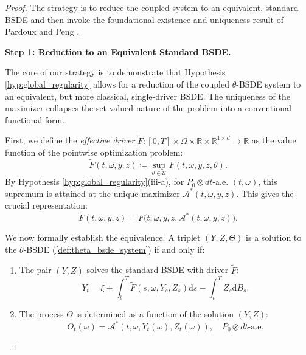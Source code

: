 \documentclass[12pt, letterpaper]{amsart}
\newcommand{\Thetacal}{\mathcal{A}}
\newcommand{\Ucal}{\mathcal{U}}
\newcommand{\R}{\mathbb{R}}
\newcommand{\dd}{\mathrm{d}}
\theoremstyle{plain}
\theoremstyle{definition}
\theoremstyle{remark}
\numberwithin{equation}{section} %
\begin{document}
\begin{proof}
The strategy is to reduce the coupled system to an equivalent, standard BSDE and then invoke the foundational existence and uniqueness result of Pardoux and Peng \cite{PardouxPeng1990}.

\vspace{1ex}
\noindent\textbf{Step 1: Reduction to an Equivalent Standard BSDE.}

The core of our strategy is to demonstrate that Hypothesis \ref{hyp:global_regularity} allows for a reduction of the coupled $\theta$-BSDE system to an equivalent, but more classical, single-driver BSDE. The uniqueness of the maximizer collapses the set-valued nature of the problem into a conventional functional form.

First, we define the \emph{effective driver} $\tilde{F}: [0,T]\times\Omega\times\R\times\R^{1\times d} \to \R$ as the value function of the pointwise optimization problem:
\begin{equation}
    \tilde{F}(t,\omega,y,z) \coloneqq \sup_{\theta \in \Ucal} F(t,\omega,y,z,\theta).
\end{equation}
By Hypothesis \ref{hyp:global_regularity}(iii-a), for $P_0\otimes dt$-a.e. $(t,\omega)$, this supremum is attained at the unique maximizer $\Thetacal^*(t,\omega,y,z)$. This gives the crucial representation:
\begin{equation}
    \tilde{F}(t,\omega,y,z) = F\big(t, \omega, y, z, \Thetacal^*(t,\omega,y,z)\big).
\end{equation}

We now formally establish the equivalence. A triplet $(Y,Z,\Theta)$ is a solution to the $\theta$-BSDE (\cref{def:theta_bsde_system}) if and only if:
\begin{enumerate}[label=(\alph*)]
    \item The pair $(Y,Z)$ solves the standard BSDE with driver $\tilde{F}$:
    \begin{equation} \label{eq:proof_effective_bsde_step1}
        Y_t = \xi + \int_t^T \tilde{F}(s, \omega, Y_s, Z_s) \dd s - \int_t^T Z_s \dd B_s.
    \end{equation}
    \item The process $\Theta$ is determined as a function of the solution $(Y,Z)$:
    \begin{equation} \label{eq:theta_as_function}
         \Theta_t(\omega) = \Thetacal^*(t, \omega, Y_t(\omega), Z_t(\omega)), \quad P_0 \otimes dt\text{-a.e.}
    \end{equation}
\end{enumerate}


\end{proof}
\end{document}

